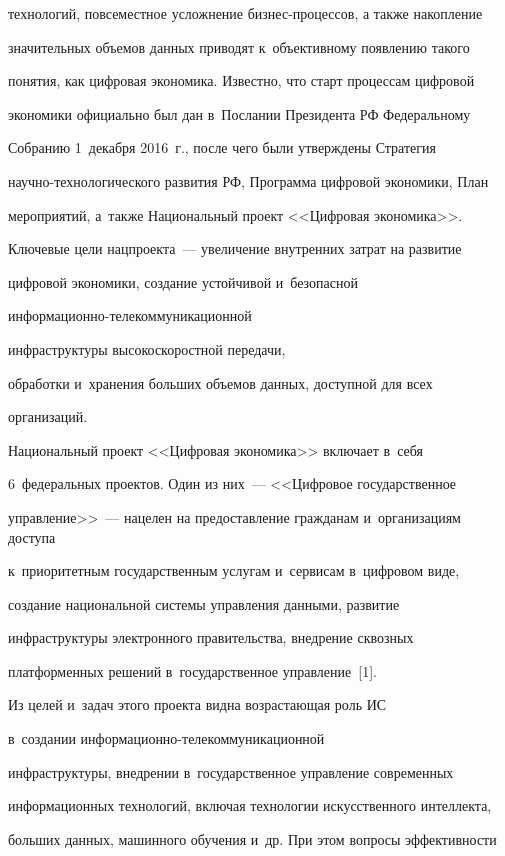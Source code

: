 технологий, повсеместное усложнение бизнес-процессов, а также накопление 

значительных объемов данных приводят к~объективному появлению такого 

понятия, как цифровая экономика. Известно, что старт процессам цифровой 

экономики официально был дан в~Послании Президента РФ Федеральному 

Собранию 1~декабря 2016~г., после чего были утверждены Стратегия 

на\-уч\-но-тех\-но\-ло\-ги\-че\-ско\-го развития РФ, Программа цифровой экономики, План 

мероприятий, а~также Национальный проект <<Цифровая экономика>>. 

Ключевые цели нацпроекта~--- увеличение внутренних затрат на развитие 

цифровой экономики, создание устойчивой и~безопасной 

ин\-фор\-ма\-ци\-он\-но-те\-ле\-ком\-му\-ни\-ка\-ци\-он\-ной 

инфраструктуры высокоскоростной передачи, 

обработки и~хранения больших объемов данных, доступной для всех 

организаций. 

  

  Национальный проект <<Цифровая экономика>> включает в~себя 

  6~федеральных проектов. Один из них~--- <<Цифровое государственное 

управление>>~--- нацелен на предоставление гражданам и~организациям доступа 

к~приоритетным государственным услугам и~сервисам в~цифровом виде, 

создание национальной системы управления данными, развитие 

инфраструктуры электронного правительства, внедрение сквозных 

платформенных решений в~государственное управление~[1].

  

  Из целей и~задач этого проекта видна возрастающая роль ИС 

  в~создании информационно-телекоммуникационной 

инфраструктуры, внедрении в~государственное управление современных 

информационных технологий, включая технологии искусственного интеллекта, 

больших данных, машинного обучения и~др. При этом вопросы эффективности 

